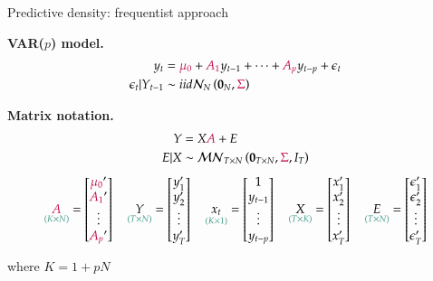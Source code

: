 \documentclass[notes,blackandwhite,mathsans,usenames,dvipsnames]{beamer}
\begin{document}
\begin{frame}{Predictive density: frequentist approach}

\textbf{VAR($p$) model.}
\begin{align*}
y_t &= {\color{purple}\mu_0} + {\color{purple}A_1} y_{t-1} + \dots + {\color{purple}A_p} y_{t-p} + \epsilon_t\\
\epsilon_t|Y_{t-1} &\sim iid\mathcal{N}_N\left(\mathbf{0}_N,{\color{purple}\Sigma}\right)
\end{align*}

\bigskip\textbf{Matrix notation.}
\begin{align*} 
Y &= X{\color{purple}A} + E\\
E|X &\sim\mathcal{MN}_{T\times N}\left(\mathbf{0}_{T\times N},{\color{purple}\Sigma}, I_T\right)
\end{align*} 
\footnotesize
$$ 
\underset{\color{mcxs2}(K\times N)}{{\color{purple}A}}=\begin{bmatrix} {\color{purple}\mu_0}'\\ {\color{purple}A_1}'\\ \vdots \\ {\color{purple}A_p}' \end{bmatrix} \quad
\underset{\color{mcxs2}(T\times N)}{Y}= \begin{bmatrix}y_1' \\ y_2'\\ \vdots \\ y_T'\end{bmatrix} \quad
\underset{\color{mcxs2}(K\times1)}{x_t}=\begin{bmatrix} 1\\ y_{t-1}\\ \vdots \\ y_{t-p} \end{bmatrix}\quad
\underset{\color{mcxs2}(T\times K)}{X}= \begin{bmatrix}x_1' \\ x_2' \\ \vdots \\ x_{T}'\end{bmatrix} \quad
\underset{\color{mcxs2}(T\times N)}{E}= \begin{bmatrix}\epsilon_1' \\ \epsilon_2' \\ \vdots \\ \epsilon_{T}'\end{bmatrix}
$$

{\color{mcxs2}where} $K=1+pN$

\end{frame}
\end{document}
